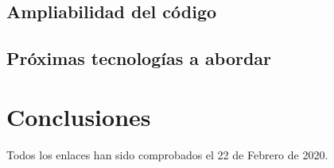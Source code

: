 \documentclass[
  a4paper,  %
  twoside,  %
  bibliography=totoc,
  headsepline,
  cleardoublepage=empty,
  parskip=half,
  draft=false
]{scrbook}
\begin{document}
\section{Ampliabilidad del código}


\section{Próximas tecnologías a abordar}


\chapter{Conclusiones}

\printbibliography

Todos los enlaces han sido comprobados el 22 de Febrero de 2020.

% 

\pagestyle{empty}
\renewcommand*{\chapterpagestyle}{empty}
\end{document}
